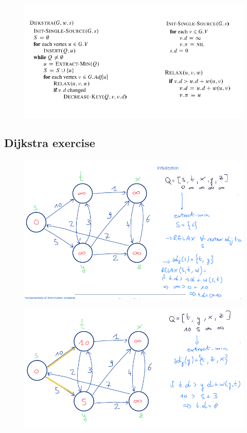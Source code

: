 \begin{figure}[H]
    \centering
    \includegraphics[width=0.75\linewidth]{dijkstra algorithm .png}
    \caption{}
    \label{fig:enter-label}
\end{figure}

\subsection{Dijkstra exercise}
\begin{figure}[H]
    \centering
    \includegraphics[width=0.75\linewidth]{dij ex 1.png}
    \caption{}
    \label{fig:enter-label}
\end{figure}

\begin{figure}[H]
    \centering
    \includegraphics[width=0.75\linewidth]{dij ex 2.png}
    \caption{}
    \label{fig:enter-label}
\end{figure}

